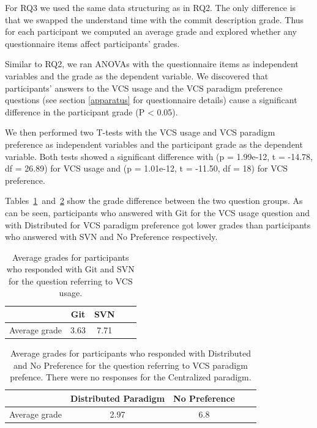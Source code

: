 \documentclass[letterpaper]{article}
\begin{document}
For RQ3 we used the same data structuring as in RQ2.
The only difference is that we swapped the understand time with the commit description grade.
Thus for each participant we computed an average grade and explored whether any questionnaire items affect participants' grades.


Similar to RQ2, we ran ANOVAs with the questionnaire items as independent variables and the grade as the dependent variable. 
We discovered that participants' answers to the VCS usage and the VCS paradigm preference questions (see section \ref{apparatus} for questionnaire details) cause a significant difference in the participant grade (P \textless{} 0.05).

We then performed two T-tests with the VCS usage and VCS paradigm preference as independent variables and the participant grade as the dependent variable.
Both tests showed a significant difference with (p = 1.99e-12, t = -14.78, df = 26.89) for VCS usage and (p = 1.01e-12, t = -11.50, df = 18) for VCS preference.

Tables~\ref{tab:rq3_vcsUsage}~and~\ref{tab:rq3_vcsPreference} show the grade difference between the two question groups.
As can be seen, participants who answered with Git for the VCS usage question and with Distributed for VCS paradigm preference got lower grades than participants who answered with SVN and No Preference respectively.

\begin{table}[H]
	\centering
	\begin{tabular}{c | c c c c}
										& Git  & SVN \\ \hline
	Average grade & 3.63 & 7.71
	\end{tabular}
	\caption{Average grades for participants who responded with Git and SVN for the question referring to VCS usage.}
	\label{tab:rq3_vcsUsage}
\end{table}

\begin{table}[H]
	\centering
	\begin{tabular}{c | c c c c}
							& Distributed Paradigm  & No Preference \\ \hline
	Average grade & 2.97 & 6.8 
	\end{tabular}
	\caption{Average grades for participants who responded with Distributed and No Preference for the question referring to VCS paradigm prefence. There were no responses for the Centralized paradigm.}
	\label{tab:rq3_vcsPreference}
\end{table}
\end{document}
